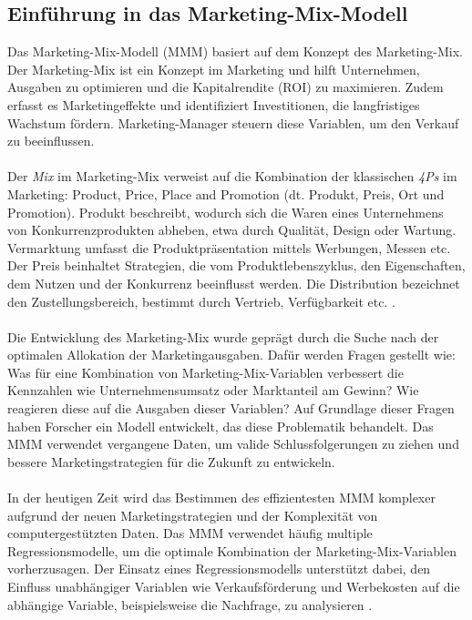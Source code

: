 \subsection{Einführung in das Marketing-Mix-Modell}
\label{EinführungInDasMMM}
Das Marketing-Mix-Modell (\ac{MMM}) basiert auf dem Konzept des Marketing-Mix. Der Marketing-Mix ist ein Konzept im Marketing und hilft Unternehmen, Ausgaben zu optimieren und die Kapitalrendite (\ac{ROI}) zu maximieren. Zudem erfasst es Marketingeffekte und identifiziert Investitionen, die langfristiges Wachstum fördern. Marketing-Manager steuern diese Variablen, um den Verkauf zu beeinflussen. \\\\
Der \textit{Mix} im Marketing-Mix verweist auf die Kombination der klassischen \textit{4Ps} im Marketing: Product, Price, Place and Promotion (dt. Produkt, Preis, Ort und Promotion)\cite[S. 110]{akinkunmi2018data}. Produkt beschreibt, wodurch sich die Waren eines Unternehmens von Konkurrenzprodukten abheben, etwa durch Qualität, Design oder Wartung. Vermarktung umfasst die Produktpräsentation mittels Werbungen, Messen etc. Der Preis beinhaltet Strategien, die vom Produktlebenszyklus, den Eigenschaften, dem Nutzen und der Konkurrenz beeinflusst werden. Die Distribution bezeichnet den Zustellungsbereich, bestimmt durch Vertrieb, Verfügbarkeit etc. \cite[109--110]{akinkunmi2018data}. \\\\
Die Entwicklung des Marketing-Mix wurde geprägt durch die Suche nach der optimalen Allokation der Marketingausgaben. Dafür werden Fragen gestellt wie: Was für eine Kombination von Marketing-Mix-Variablen verbessert die Kennzahlen wie Unternehmensumsatz oder Marktanteil am Gewinn? Wie reagieren diese auf die Ausgaben dieser Variablen? Auf Grundlage dieser Fragen haben Forscher ein Modell entwickelt, das diese Problematik behandelt. Das \ac{MMM} verwendet vergangene Daten, um valide Schlussfolgerungen zu ziehen und bessere Marketingstrategien für die Zukunft zu entwickeln.\\\\
In der heutigen Zeit wird das Bestimmen des effizientesten \ac{MMM} komplexer aufgrund der neuen Marketingstrategien und der Komplexität von computergestützten Daten. Das \ac{MMM} verwendet häufig multiple Regressionsmodelle, um die optimale Kombination der Marketing-Mix-Variablen vorherzusagen. Der Einsatz eines Regressionsmodells unterstützt dabei, den Einfluss unabhängiger Variablen wie Verkaufsförderung und Werbekosten auf die abhängige Variable, beispielsweise die Nachfrage, zu analysieren \cite[110]{akinkunmi2018data}.\\\\
